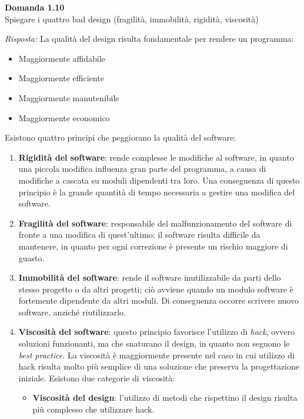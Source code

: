 \documentclass{article}
\newenvironment{problem}[2][Domanda]
    { \begin{mdframed}[backgroundcolor=gray!20] \textbf{#1 #2} \\}
    {  \end{mdframed}}
\newenvironment{solution}
    {\textit{Risposta:}}
    {}
\begin{document}
\begin{problem}{1.10}
Spiegare i quattro bad design (fragilità, immobilità, rigidità, viscosità)
\end{problem}
\begin{solution}
La qualità del design risulta fondamentale per rendere un programma:
\begin{itemize}
	\item Maggiormente affidabile
	\item Maggiormente efficiente
	\item Maggiormente manutenibile
	\item Maggiormente economico
\end{itemize}
Esistono quattro principi che peggiorano la qualità del software:
\begin{enumerate}
	\item \textbf{Rigidità del software}: rende complesse le modifiche al software, in quanto una piccola modifica influenza gran parte del programma, a causa di modifiche a cascata su moduli dipendenti tra loro.
	\newline Una conseguenza di questo principio è la grande quantità di tempo necessaria a gestire una modifica del software.
	\item \textbf{Fragilità del software}: responsabile del malfunzionamento del software di fronte a una modifica di quest'ultimo; il software risulta difficile da mantenere, in quanto per ogni correzione è presente un rischio maggiore di guasto.
	\item \textbf{Immobilità del software}: rende il software inutilizzabile da parti dello stesso progetto o da altri progetti; ciò avviene quando un modulo software è fortemente dipendente da altri moduli.
	\newline Di conseguenza occorre scrivere nuovo software, anziché riutilizzarlo.
	\item \textbf{Viscosità del software}: questo principio favorisce l'utilizzo di \textit{hack}, ovvero soluzioni funzionanti, ma che snaturano il design, in quanto non seguono le \textit{best practice}.
	\newline
	La viscosità è maggiormente presente nel caso in cui utilizzo di hack risulta molto più semplice di una soluzione che preserva la progettazione iniziale.
	\newline
	Esistono due categorie di viscosità:
	\begin{itemize}
		\item \textbf{Viscosità del design}: l'utilizzo di metodi che rispettino il design risulta più complesso che utilizzare hack.

\end{itemize}
\end{enumerate}
\end{solution}
\end{document}
